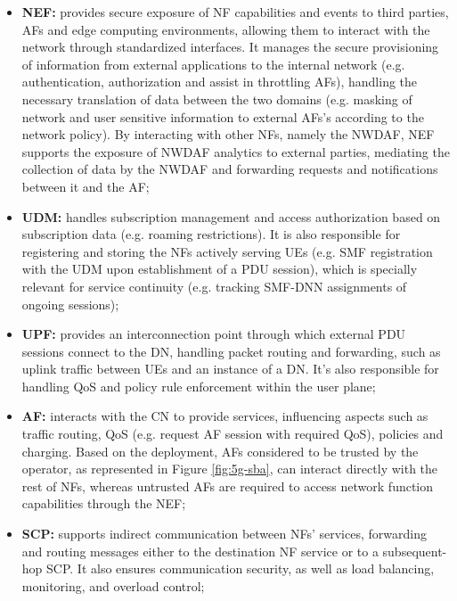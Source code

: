 \begin{itemize}
    \item{\textbf{\acf{NEF}:}} provides secure exposure of \acs{NF} capabilities and events to third parties, \acsp{AF} and edge computing environments, allowing them to interact with the network through standardized interfaces. It manages the secure provisioning of information from external applications to the internal network (e.g. authentication, authorization and assist in throttling \acsp{AF}), handling the necessary translation of data between the two domains (e.g. masking of network and user sensitive information to external \acsp{AF}'s according to the network policy). By interacting with other \acsp{NF}, namely the \acs{NWDAF}, \acs{NEF} supports the exposure of \acs{NWDAF} analytics to external parties, mediating the collection of data by the \acs{NWDAF} and forwarding requests and notifications between it and the \acs{AF};

    \item{\textbf{\acf{UDM}:}} handles subscription management and access authorization based on subscription data (e.g. roaming restrictions). It is also responsible for registering and storing the \acp{NF} actively serving \acp{UE} (e.g. \ac{SMF} registration with the \ac{UDM} upon establishment of a \ac{PDU} session), which is specially relevant for service continuity (e.g. tracking \ac{SMF}-\ac{DNN} assignments of ongoing sessions);

    \item{\textbf{\acf{UPF}:}} provides an interconnection point through which external \ac{PDU} sessions connect to the \ac{DN}, handling packet routing and forwarding, such as uplink traffic between \acp{UE} and an instance of a \ac{DN}. It's also responsible for handling \ac{QoS} and policy rule enforcement within the user plane;

    \item{\textbf{\acf{AF}:}} interacts with the \ac{CN} to provide services, influencing aspects such as traffic routing, \ac{QoS} (e.g. request \acs{AF} session with required \ac{QoS}), policies and charging. Based on the deployment, \acsp{AF} considered to be trusted by the operator, as represented in Figure \ref{fig:5g-sba}, can interact directly with the rest of \acsp{NF}, whereas untrusted \acsp{AF} are required to access network function capabilities through the \acs{NEF};

    \item{\textbf{\acf{SCP}:}} supports indirect communication between \acp{NF}' services, forwarding and routing messages either to the destination \acs{NF} service or to a subsequent-hop \ac{SCP}. It also ensures communication security, as well as load balancing, monitoring, and overload control;


\end{itemize}
